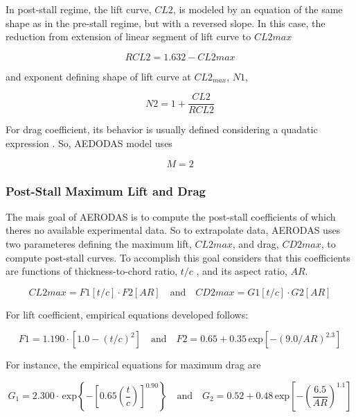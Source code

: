 In post-stall regime, the lift curve, $CL2$, is modeled by an equation of the same shape as in the pre-stall regime, but with a reversed slope. In this case, the reduction from extension of linear segment of lift curve to $CL2max$

\begin{equation}
    RCL2 = 1.632- CL2max
\end{equation}

and exponent defining shape of lift curve at $CL2_{max}$, $N1$,

\begin{equation}
    N2 = 1 + \frac{CL2}{RCL2}
\end{equation}

For drag coefficient, its behavior is usually defined considering a quadatic expression \cite{spera_models_2008}. So, AEDODAS model uses 

\begin{equation}
    M = 2
\end{equation}

\subsubsection{Post-Stall Maximum Lift and Drag}

The mais goal of AERODAS is to compute the post-stall coefficients of which theres no available experimental data. So to extrapolate data, AERODAS uses two parameteres defining the maximum lift, $CL2max$, and drag, $CD2max$, to compute post-stall curves. To accomplish this goal \cite{spera_models_2008} considers  that this coefficients are functions of thickness-to-chord ratio, $t/c$ , and its aspect ratio, $AR$.

\begin{equation}
    CL2max = F1  \left[ t/c \right] \cdot F2 \left[ AR \right] \quad \text{and} \quad CD2max= G1 \left[ t/c \right] \cdot G2 \left[ AR \right]
\end{equation}

For lift coefficient, empirical equations developed follows:

\begin{equation}
    F1=1.190\cdot\left[1.0-\left(t/c\right)^{2}\right] \quad \text{and} \quad F2= 0.65 + 0.35\,\mathrm{exp}\left[-\left(9.0\slash{A}R\right)^{2.3}\right]
\end{equation}

For instance, the empirical equations for maximum drag are

\begin{equation}
    G_1 = 2.300\cdot\,\mathrm{exp}\left\{-\left[0.65\left(\frac{t}{c}\right)\right]^{0.90}\right\} \quad \text{and} \quad G_2 = 0.52 + 0.48\,\mathrm{exp}\left[-\left(\frac{6.5}{A R}\right)^{1.1}\right]
\end{equation}

